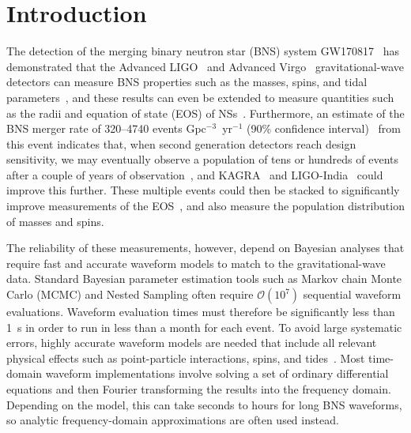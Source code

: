 \documentclass[prd,aps,letter,twocolumn,floatfix,notitlepage,nofootinbib]{revtex4-1}
\begin{document}

\section{Introduction}

The detection of the merging binary neutron star (BNS) system GW170817~\cite{GW170817} has demonstrated that the Advanced LIGO~\cite{Harry2010} and Advanced Virgo~\cite{Acernese2009} gravitational-wave detectors can measure BNS properties such as the masses, spins, and tidal parameters~\cite{BNSPE}, and these results can even be extended to measure quantities such as the radii and equation of state (EOS) of NSs~\cite{RaithelOzelPsaltis2018, DeFinstadLattimer2018, EOSPaper}. Furthermore, an estimate of the BNS merger rate of 320--4740 events Gpc$^{-3}$~yr$^{-1}$ (90\% confidence interval)~\cite{GW170817} from this event indicates that, when second generation detectors reach design sensitivity, we may eventually observe a population of tens or hundreds of events after a couple of years of observation~\cite{LIGORate2010}, and KAGRA~\cite{Somiya2012} and LIGO-India~\cite{IyerSouradeepUnnikrishnan2011} could improve this further. These multiple events could then be stacked to significantly improve measurements of the EOS~\cite{DelPozzoLiAgathos2013, LackeyWade2015}, and also measure the population distribution of masses and spins. 

The reliability of these measurements, however, depend on Bayesian analyses that require fast and accurate waveform models to match to the gravitational-wave data. Standard Bayesian parameter estimation tools such as Markov chain Monte Carlo (MCMC) and Nested Sampling often require $\mathcal{O}(10^7)$ sequential waveform evaluations. Waveform evaluation times must therefore be significantly less than 1~s in order to run in less than a month for each event. To avoid large systematic errors, highly accurate waveform models are needed that include all relevant physical effects such as point-particle interactions, spins, and tides~\cite{Favata2014, YagiYunes2014, WadeCreightonOchsner2014}. Most time-domain waveform implementations involve solving a set of ordinary differential equations and then Fourier transforming the results into the frequency domain. Depending on the model, this can take seconds to hours for long BNS waveforms, so analytic frequency-domain approximations are often used instead. 
\end{document}
